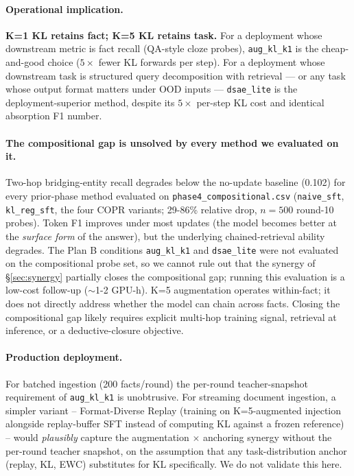 \documentclass[11pt]{article}
\newcommand{\code}[1]{\texttt{\small #1}}
\begin{document}
\paragraph{Operational implication.}
\textbf{K=1 KL retains fact; K=5 KL retains task.} For a deployment
whose downstream metric is fact recall (QA-style cloze probes),
\code{aug\_kl\_k1} is the cheap-and-good choice ($5\times$ fewer KL
forwards per step). For a deployment whose downstream task is structured
query decomposition with retrieval --- or any task whose output format
matters under OOD inputs --- \code{dsae\_lite} is the deployment-superior
method, despite its $5\times$ per-step KL cost and identical absorption
F1 number.

\paragraph{The compositional gap is unsolved by every method we evaluated on it.}
Two-hop bridging-entity recall degrades below the no-update baseline
(0.102) for every prior-phase method evaluated on
\code{phase4\_compositional.csv} (\code{naive\_sft}, \code{kl\_reg\_sft},
the four COPR variants; 29-86\% relative drop, $n=500$ round-10 probes).
Token F1 improves under most updates (the model becomes better at the
\emph{surface form} of the answer), but the underlying chained-retrieval
ability degrades. The Plan B conditions \code{aug\_kl\_k1} and
\code{dsae\_lite} were not evaluated on the compositional probe set, so
we cannot rule out that the synergy of \S\ref{sec:synergy} partially
closes the compositional gap; running this evaluation is a low-cost
follow-up ($\sim$1-2 GPU-h). K=5 augmentation operates within-fact; it
does not directly address whether the model can chain across facts.
Closing the compositional gap likely requires explicit multi-hop training
signal, retrieval at inference, or a deductive-closure objective.

\paragraph{Production deployment.}
For batched ingestion (200 facts/round) the per-round teacher-snapshot
requirement of \code{aug\_kl\_k1} is unobtrusive. For streaming document
ingestion, a simpler variant -- Format-Diverse Replay (training on
K=5-augmented injection alongside replay-buffer SFT instead of computing
KL against a frozen reference) -- would \emph{plausibly} capture the
augmentation $\times$ anchoring synergy without the per-round teacher
snapshot, on the assumption that any task-distribution anchor (replay,
KL, EWC) substitutes for KL specifically. We do not validate this here.
\end{document}
